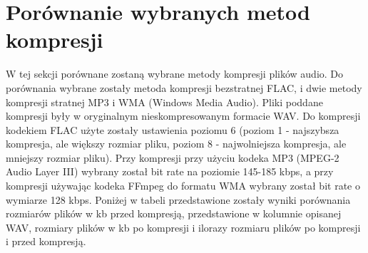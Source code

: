 \documentclass[a4paper,12pt]{extarticle}
\begin{document}
\section*{Porównanie wybranych metod kompresji}

W tej sekcji porównane zostaną wybrane metody kompresji plików audio. Do porównania wybrane zostały metoda kompresji bezstratnej FLAC, i dwie metody kompresji stratnej MP3 i WMA (Windows Media Audio). Pliki poddane kompresji były w oryginalnym nieskompresowanym formacie WAV. Do kompresji kodekiem FLAC użyte zostały ustawienia poziomu 6 (poziom 1 - najszybsza kompresja, ale większy rozmiar pliku, poziom 8 - najwolniejsza kompresja, ale mniejszy rozmiar pliku). Przy kompresji przy użyciu kodeka MP3 (MPEG-2 Audio Layer III) wybrany został bit rate na poziomie 145-185 kbps, a przy kompresji używając kodeka FFmpeg do formatu WMA wybrany został bit rate o wymiarze 128 kbps.
Poniżej w tabeli przedstawione zostały wyniki porównania rozmiarów plików w kb przed kompresją, przedstawione w kolumnie opisanej WAV, rozmiary plików w kb po kompresji i ilorazy rozmiaru plików po kompresji i przed kompresją.
\end{document}
